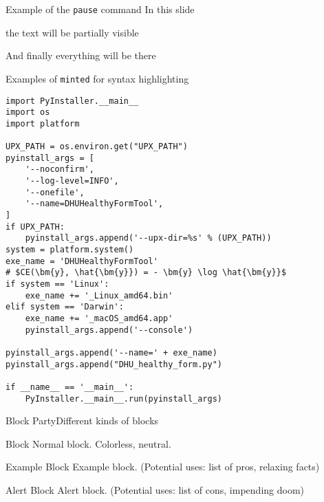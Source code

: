 \begin{frame}[c]{Example of the \texttt{pause} command}
	In this slide \pause

	the text will be partially visible \pause

	And finally everything will be there
\end{frame}

\begin{frame}[fragile]{Examples of \texttt{minted} for syntax highlighting}
	\begin{overprint}
		\begin{verbatim}
import PyInstaller.__main__
import os
import platform

UPX_PATH = os.environ.get("UPX_PATH")
pyinstall_args = [
	'--noconfirm',
	'--log-level=INFO',
	'--onefile',
	'--name=DHUHealthyFormTool',
]
if UPX_PATH:
	pyinstall_args.append('--upx-dir=%s' % (UPX_PATH))
system = platform.system()
exe_name = 'DHUHealthyFormTool'
# $CE(\bm{y}, \hat{\bm{y}}) = - \bm{y} \log \hat{\bm{y}}$
if system == 'Linux':
	exe_name += '_Linux_amd64.bin'
elif system == 'Darwin':
	exe_name += '_macOS_amd64.app'
	pyinstall_args.append('--console')

pyinstall_args.append('--name=' + exe_name)
pyinstall_args.append("DHU_healthy_form.py")

if __name__ == '__main__':
	PyInstaller.__main__.run(pyinstall_args)
	\end{verbatim}
	\end{overprint}
\end{frame}

\begin{frame}[c]{Block Party}{Different kinds of blocks}
	\begin{block}{Block}
		Normal block. Colorless, neutral.
	\end{block}

	\begin{exampleblock}{Example Block}
		Example block. (Potential uses: list of pros, relaxing facts)
	\end{exampleblock}

	\begin{alertblock}{Alert Block}
		Alert block. (Potential uses: list of cons, impending doom)
	\end{alertblock}
\end{frame}

\newcommand{\alertline}{%
	\usebeamercolor[fg]{normal text}%
	\only{\usebeamercolor[crimsonred]{}}}
\newcommand\hlight[1]{\tikz[overlay, remember picture,baseline=-\the\dimexpr\fontdimen22\textfont2\relax]\node[rectangle,fill=blue!50,rounded corners,fill opacity = 0.2,draw,thick,text opacity =1] {$#1$};}
\newcommand\tocalculate[1]{\tikz[overlay, remember picture,baseline=-\the\dimexpr\fontdimen22\textfont2\relax]\node[rectangle,fill=green!50,rounded corners,fill opacity = 0.2,draw,thick,text opacity =1] {$#1$};}

